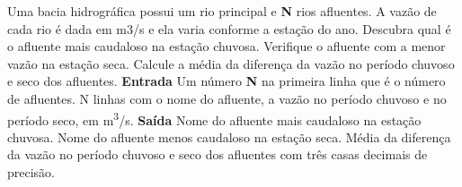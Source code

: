 \documentclass[a4paper, 12pt]{article}
\begin{document}
Uma bacia hidrográfica possui um rio principal e \textbf{N} rios afluentes. A vazão de cada rio é dada em m3/s e ela varia conforme a estação do ano. Descubra qual é o afluente mais caudaloso na estação chuvosa. Verifique o afluente com a menor vazão na estação seca. Calcule a média da diferença da vazão no período chuvoso e seco dos afluentes.
\newline \newline
\textbf{{\large Entrada}} \newline
Um número \textbf{N} na primeira linha que é o número de afluentes.
N linhas com o nome do afluente, a vazão no período chuvoso e no período seco, em m\textsuperscript{3}/s.
\newline \newline
\textbf{{\large Saída}} \newline
Nome do afluente mais caudaloso na estação chuvosa. \newline
Nome do afluente menos caudaloso na estação seca. \newline
Média da diferença da vazão no período chuvoso e seco dos afluentes com três casas decimais de precisão.
\newline \newline
\newline
\end{document}
